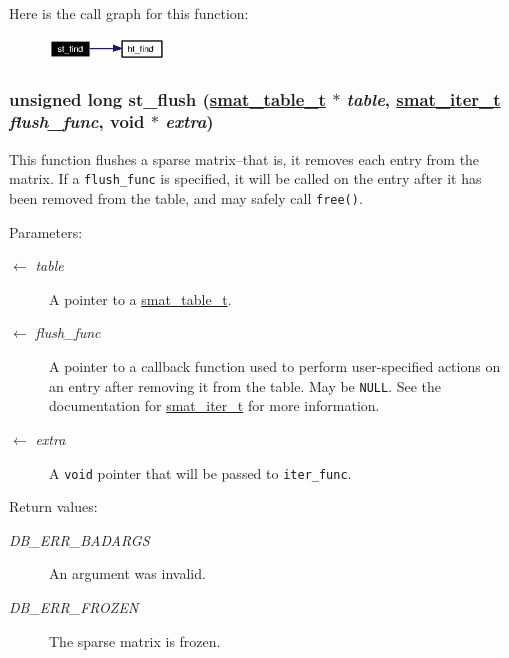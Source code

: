Here is the call graph for this function:\begin{figure}[H]
\begin{center}
\leavevmode
\includegraphics[width=87pt]{group__dbprim__smat_ga15_cgraph}
\end{center}
\end{figure}
\hypertarget{group__dbprim__smat_ga17}{
\subsubsection[st\_\-flush]{\setlength{\rightskip}{0pt plus 5cm}unsigned long st\_\-flush (\hyperlink{struct__smat__table__s}{smat\_\-table\_\-t} $\ast$ {\em table}, \hyperlink{group__dbprim__smat_ga4}{smat\_\-iter\_\-t} {\em flush\_\-func}, void $\ast$ {\em extra})}}
\label{group__dbprim__smat_ga17}


This function flushes a sparse matrix--that is, it removes each entry from the matrix. If a {\tt flush\_\-func} is specified, it will be called on the entry after it has been removed from the table, and may safely call {\tt free()}.

\begin{Desc}
\item[Parameters:]
\begin{description}
\item[\mbox{$\leftarrow$} {\em table}]A pointer to a \hyperlink{group__dbprim__smat_ga0}{smat\_\-table\_\-t}. \item[\mbox{$\leftarrow$} {\em flush\_\-func}]A pointer to a callback function used to perform user-specified actions on an entry after removing it from the table. May be {\tt NULL}. See the documentation for \hyperlink{group__dbprim__smat_ga4}{smat\_\-iter\_\-t} for more information. \item[\mbox{$\leftarrow$} {\em extra}]A {\tt void} pointer that will be passed to {\tt iter\_\-func}.\end{description}
\end{Desc}
\begin{Desc}
\item[Return values:]
\begin{description}
\item[{\em DB\_\-ERR\_\-BADARGS}]An argument was invalid. \item[{\em DB\_\-ERR\_\-FROZEN}]The sparse matrix is frozen.\end{description}
\end{Desc}


